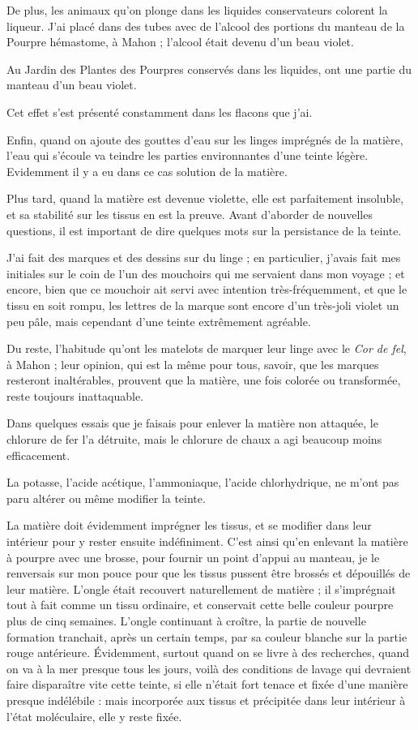 \documentclass[a4paper, 11pt, oneside, polutonikogreek, french]{article}
\begin{document}
De plus, les animaux qu'on plonge dans les liquides conservateurs colorent la liqueur. J'ai placé dans des tubes avec de l'alcool des portions du manteau de la Pourpre hémastome, à Mahon ; l'alcool était devenu d'un beau violet.

Au Jardin des Plantes des Pourpres conservés dans les liquides, ont une partie du manteau d'un beau violet.

Cet effet s'est présenté constamment dans les flacons que j'ai.

Enfin, quand on ajoute des gouttes d'eau sur les linges imprégnés de la matière, l'eau qui s'écoule va teindre les parties environnantes d'une teinte légère. Evidemment il y a eu dans ce cas solution de la matière.

Plus tard, quand la matière est devenue violette, elle est parfaitement insoluble, et sa stabilité sur les tissus en est la preuve. Avant d'aborder de nouvelles questions, il est important de dire quelques mots sur la persistance de la teinte.

J'ai fait des marques et des dessins sur du linge ; en particulier, j'avais fait mes initiales sur le coin de l'un des mouchoirs qui me servaient dans mon voyage ; et encore, bien que ce mouchoir ait servi avec intention très-fréquemment, et que le tissu en soit rompu, les lettres de la marque sont encore d'un très-joli violet un peu pâle, mais cependant d'une teinte extrêmement agréable.

Du reste, l'habitude qu'ont les matelots de marquer leur linge avec le \emph{Cor de fel}, à Mahon ; leur opinion, qui est la même pour tous, savoir, que les marques resteront inaltérables, prouvent que la matière, une fois colorée ou transformée, reste toujours inattaquable.

Dans quelques essais que je faisais pour enlever la matière non attaquée, le chlorure de fer l'a détruite, mais le chlorure de chaux a agi beaucoup moins efficacement.

La potasse, l'acide acétique, l'ammoniaque, l'acide chlorhydrique, ne m'ont pas paru altérer ou même modifier la teinte.

La matière doit évidemment imprégner les tissus, et se modifier dans leur intérieur pour y rester ensuite indéfiniment. C'est ainsi qu'en enlevant la matière à pourpre avec une brosse, pour fournir un point d'appui au manteau, je le renversais sur mon pouce pour que les tissus pussent être brossés et dépouillés de leur matière. L'ongle était recouvert naturellement de matière ; il s'imprégnait tout à fait comme un tissu ordinaire, et conservait cette belle couleur pourpre plus de cinq semaines. L'ongle continuant à croître, la partie de nouvelle formation tranchait, après un certain temps, par sa couleur blanche sur la partie rouge antérieure. Évidemment, surtout quand on se livre à des recherches, quand on va à la mer presque tous les jours, voilà des conditions de lavage qui devraient faire disparaître vite cette teinte, si elle n'était fort tenace et fixée d'une manière presque indélébile : mais incorporée aux tissus et précipitée dans leur intérieur à l'état moléculaire, elle y reste fixée.
\end{document}
